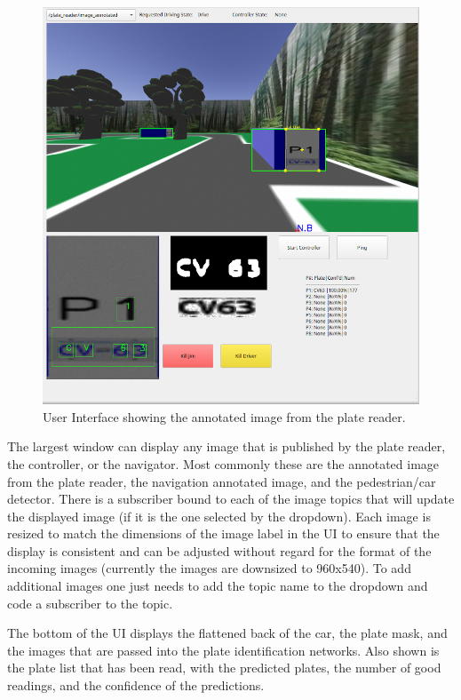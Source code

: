 \documentclass[titlepage, twocolumn]{article}
\begin{document}
\begin{figure}[H]
\centering
\includegraphics[width=\linewidth]{Gui.png}
\caption{User Interface showing the annotated image from the plate reader.}
\label{fig:UI}
\end{figure}

The largest window can display any image that is published by the plate reader, the controller, or the navigator. Most commonly these are the annotated image from the plate reader, the navigation annotated image, and the pedestrian/car detector. There is a subscriber bound to each of the image topics that will update the displayed image (if it is the one selected by the dropdown). Each image is resized to match the dimensions of the image label in the UI to ensure that the display is consistent and can be adjusted without regard for the format of the incoming images (currently the images are downsized to 960x540).
To add additional images one just needs to add the topic name to the dropdown and code a subscriber to the topic.

The bottom of the UI displays the flattened back of the car, the plate mask, and the images that are passed into the plate identification networks. Also shown is the plate list that has been read, with the predicted plates, the number of good readings, and the confidence of the predictions.
\end{document}
